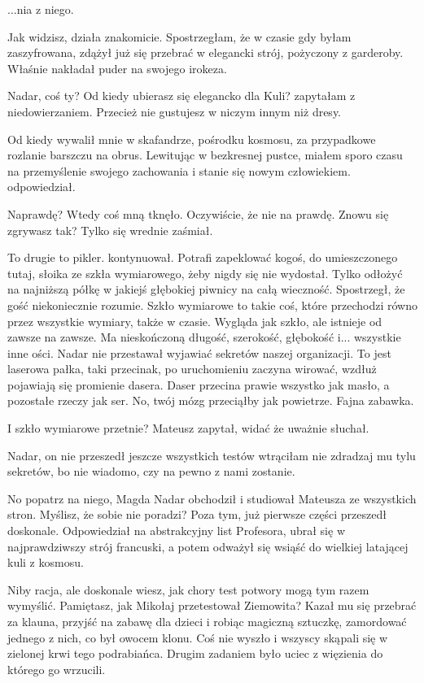 ...nia z niego. \de{}

\ds{} Jak widzisz, działa znakomicie. \dm{} Spostrzegłam, że w czasie gdy byłam zaszyfrowana, zdążył już się przebrać w elegancki strój, pożyczony z garderoby. Właśnie nakładał puder na swojego irokeza. \de{}

\ds{} Nadar, coś ty? Od kiedy ubierasz się elegancko dla Kuli? \dm{} zapytałam z niedowierzaniem. \dm{} Przecież nie gustujesz w niczym innym niż dresy. \de{}

\ds{} Od kiedy wywalił mnie w skafandrze, pośrodku kosmosu, za przypadkowe rozlanie barszczu na obrus. 
Lewitując w bezkresnej pustce, miałem sporo czasu na przemyślenie swojego zachowania i stanie się nowym człowiekiem. \dm{} odpowiedział. \de{}

\ds{} Naprawdę? \dm{} Wtedy coś mną tknęło. \dm{} Oczywiście, że nie na prawdę. Znowu się zgrywasz tak? \dm{} Tylko się wrednie zaśmiał. \de{}

\ds{} To drugie to pikler. \dm{} kontynuował. \dm{} Potrafi zapeklować kogoś, do umieszczonego tutaj, słoika ze szkła wymiarowego, żeby nigdy się nie wydostał.
Tylko odłożyć na najniższą półkę w jakiejś głębokiej piwnicy na całą wieczność.
\dm{} Spostrzegł, że gość niekoniecznie rozumie. \dm{}
Szkło wymiarowe to takie coś, które przechodzi równo przez wszystkie wymiary, także w czasie. Wygląda jak szkło, ale istnieje od zawsze na zawsze. Ma nieskończoną długość, szerokość,
głębokość i... wszystkie inne ości. \dm{}
Nadar nie przestawał wyjawiać sekretów naszej organizacji. \dm{}
To jest laserowa pałka, taki przecinak, po uruchomieniu zaczyna wirować, wzdłuż pojawiają się promienie dasera. Daser przecina prawie wszystko jak masło,
a pozostałe rzeczy jak ser. No, twój mózg przeciąłby jak powietrze.
Fajna zabawka. \de{}

\ds{} I szkło wymiarowe przetnie? \ds{} Mateusz zapytał, widać że uważnie słuchał. \de{}

\ds{} Nadar, on nie przeszedł jeszcze wszystkich testów \dm{} wtrąciłam \dm{} nie zdradzaj mu tylu sekretów, bo nie wiadomo, czy na pewno z nami zostanie.

\ds{} No popatrz na niego, Magda \dm{} Nadar obchodził i studiował Mateusza ze wszystkich stron. \dm{} Myślisz, że sobie nie poradzi?
Poza tym, już pierwsze części przeszedł doskonale. Odpowiedział na abstrakcyjny list Profesora, ubrał się w najprawdziwszy strój francuski, a potem 
odważył się wsiąść do wielkiej latającej kuli z kosmosu. \de{}

\ds{} Niby racja, ale doskonale wiesz, jak chory test potwory mogą tym razem wymyślić.
Pamiętasz, jak Mikołaj przetestował Ziemowita? Kazał mu się przebrać za klauna, przyjść na zabawę dla dzieci i robiąc magiczną sztuczkę, zamordować jednego z nich, co był owocem klonu.
Coś nie wyszło i wszyscy skąpali się w zielonej krwi tego podrabiańca.
Drugim zadaniem było uciec z więzienia do którego go wrzucili. \de{}

